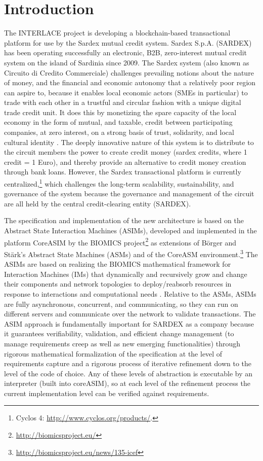 \chapter{Introduction}
\label{ch:Introduction}

The INTERLACE project is developing a blockchain-based transactional platform for use by the Sardex mutual credit system. Sardex S.p.A. (SARDEX) has been operating successfully an electronic, B2B, zero-interest mutual credit system on the island of Sardinia since 2009. The Sardex system (also known as Circuito di Credito Commerciale) challenges prevailing notions about the nature of money, and the financial and economic autonomy that a relatively poor region can aspire to, because it enables local economic actors (SMEs in particular) to trade with each other in a trustful and circular fashion with a unique digital trade credit unit. It does this by monetizing the spare capacity of the local economy in the form of mutual, and taxable, credit between participating companies, at zero interest, on a strong basis of trust, solidarity, and local cultural identity \cite{LitteraEtAl2017,DiniMottaSartori2016,SartoriDini2016}. The deeply innovative nature of this system is to distribute to the circuit members the power to create credit money (sardex credits, where 1 credit = 1 Euro), and thereby provide an alternative to credit money creation through bank loans. However, the Sardex transactional platform is currently centralized,\footnote{Cyclos 4: \url{http://www.cyclos.org/products/}.} which challenges the long-term scalability, sustainability, and governance of the system because the governance and management of the circuit are all held by the central credit-clearing entity (SARDEX).

The specification and implementation of the new architecture is based on the Abstract State Interaction Machines (ASIMs), developed and implemented in the platform CoreASIM by the BIOMICS project\footnote{\url{http://biomicsproject.eu/}} \cite{BIOMICSD41,BIOMICSD42,BIOMICSD52} as extensions of B\"orger and St\"ark's \cite{BoergerStaerk2003} Abstract State Machines (ASMs) and of the CoreASM environment.\footnote{\url{http://biomicsproject.eu/news/135-icef}} The ASIMs are based on realizing the BIOMICS mathematical framework for Interaction Machines (IMs) that dynamically and recursively grow and change their components and network topologies to deploy/reabsorb resources in response to interactions and computational needs \cite{NehanivEtAl2015}. Relative to the ASMs, ASIMs are fully asynchronous, concurrent, and communicating, so they can run on different servers and communicate over the network to validate transactions. The ASIM approach is fundamentally important for SARDEX as a company because it guarantees verifiability, validation, and efficient change management (to manage requirements creep as well as new emerging functionalities) through rigorous mathematical formalization of the specification at the level of requirements capture and a rigorous process of iterative refinement down to the level of the code of choice.
Any of these levels of abstraction is executable by an interpreter (built into coreASIM), so at each level of the refinement process the current implementation level can be verified against requirements.

